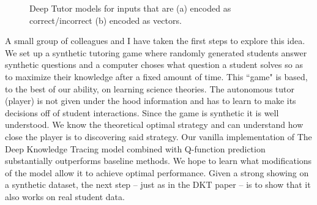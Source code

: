  \begin{figure}[ht]
 \centering
 
 \caption[Deep tutor models]{Deep Tutor models for inputs that are (a) encoded as correct/incorrect (b) encoded as vectors.}

 \end{figure}

A small group of colleagues and I have taken the first steps to explore this idea. We set up a synthetic tutoring game where randomly generated students answer synthetic questions and a computer choses what question a student solves so as to maximize their knowledge after a fixed amount of time. This ``game" is based, to the best of our ability, on learning science theories. The autonomous tutor (player) is not given under the hood information and has to learn to make its decisions off of student interactions. Since the game is synthetic it is well understood. We know the theoretical optimal strategy and can understand how close the player is to discovering said strategy. Our vanilla implementation of The Deep Knowledge Tracing model combined with Q-function prediction substantially outperforms baseline methods. We hope to learn what modifications of the model allow it to achieve optimal performance. Given a strong showing on a synthetic dataset, the next step -- just as in the DKT paper -- is to show that it also works on real student data.

